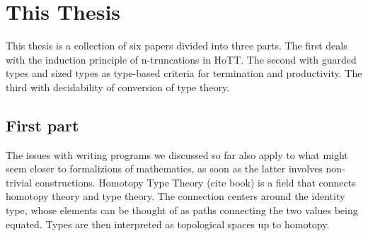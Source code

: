 \documentclass{book}
\begin{document}
\section{This Thesis}

This thesis is a collection of six papers divided into three parts.
The first deals with the induction principle of n-truncations in HoTT.
The second with guarded types and sized types as type-based criteria
for termination and productivity. The third with decidability of
conversion of type theory.

\subsection{First part}
The issues with writing programs we discussed so far also apply to
what might seem closer to formalizions of mathematics, as soon as the
latter involves non-trivial constructions.
Homotopy Type Theory (cite book) is a field that connects homotopy theory and type theory.
The connection centers around the identity type, whose elements can be
thought of as paths connecting the two values being equated. Types are
then interpreted as topological spaces up to homotopy.
\end{document}
